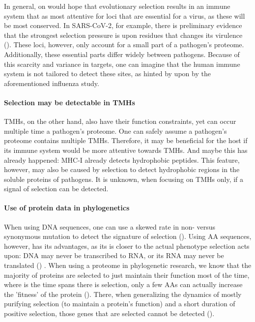 In general, on would hope that evolutionary selection results in
an immune system that as most attentive for loci that are
essential for a virus, as these will be most conserved.
In SARS-CoV-2, for example, there is preliminary evidence that the strongest
selection pressure is upon residues that changes its 
virulence (\cite{velazquez2020positive}).
These loci, however, only account for a small part of a pathogen's proteome.
Additionally, these essential parts differ widely between pathogens.
Because of this scarcity and variance in targets, 
one can imagine that the human immune system 
is not tailored to detect these sites, 
as hinted by upon by the aforementioned influenza study.

\paragraph{Selection may be detectable in TMHs}

TMHs, on the other hand, also have their function constraints, 
yet can occur multiple time a pathogen's proteome.
One can safely assume a pathogen's proteome contains multiple TMHs.
Therefore, it may be beneficial for the host
if its immune system would be more attentive towards TMHs.
And maybe this has already happened: MHC-I already detects hydrophobic
peptides. This feature, however, may also be caused by selection
to detect hydrophobic regions in the soluble proteins of pathogens.
It is unknown, when focusing on TMHs only, if a signal of selection
can be detected.

\paragraph{Use of protein data in phylogenetics}

When using DNA sequences, one can use a skewed rate
in non- versus synonymous mutation
to detect the signature of selection (\cite{murrell2015gene}).
Using AA sequences, however, has its advantages,
as its is closer to the actual phenotype
selection acts upon: DNA may never be transcribed to RNA,
or its RNA may never be translated (\cite{diz2012proteomics})
.
When using a proteome in phylogenetic research,
we know that the majority of proteins are selected to just
maintain their function most of the time, where
is the time spans there is selection, only a few AAs
can actually increase the 'fitness' of the
protein (\cite{anisimova2009investigating}).
There, when generalizing the dynamics of mostly purifying selection (to maintain
a protein's function) and a short duration of positive selection,
those genes that are selected cannot be detected (\cite{yang2000statistical}).


